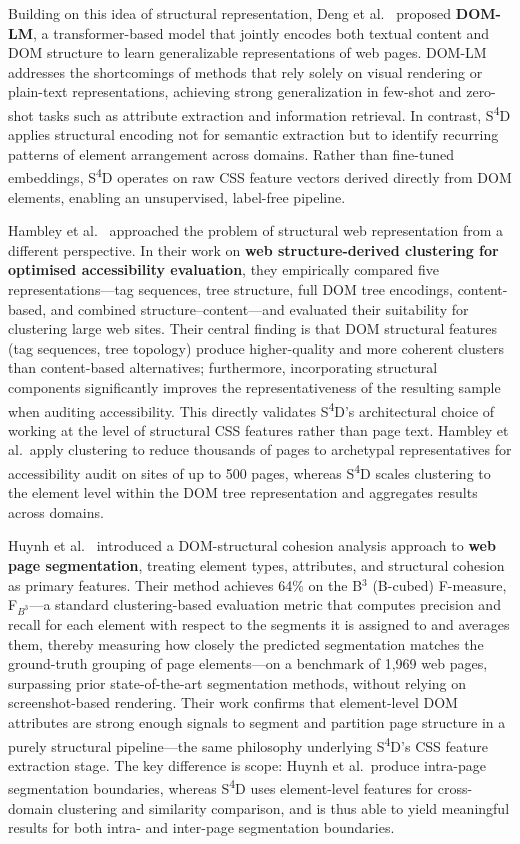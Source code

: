 Building on this idea of structural representation, Deng et al.~\cite{deng2022domlm} proposed \textbf{DOM-LM}, a transformer-based model that jointly encodes both textual content and DOM structure to learn generalizable representations of web pages. DOM-LM addresses the shortcomings of methods that rely solely on visual rendering or plain-text representations, achieving strong generalization in few-shot and zero-shot tasks such as attribute extraction and information retrieval. In contrast, S\textsuperscript{4}D applies structural encoding not for semantic extraction but to identify recurring patterns of element arrangement across domains. Rather than fine-tuned embeddings, S\textsuperscript{4}D operates on raw CSS feature vectors derived directly from DOM elements, enabling an unsupervised, label-free pipeline.

Hambley et al.~\cite{hambley2023webstructure} approached the problem of structural web representation from a different perspective. In their work on \textbf{web structure-derived clustering for optimised accessibility evaluation}, they empirically compared five representations---tag sequences, tree structure, full DOM tree encodings, content-based, and combined structure--content---and evaluated their suitability for clustering large web sites. Their central finding is that DOM structural features (tag sequences, tree topology) produce higher-quality and more coherent clusters than content-based alternatives; furthermore, incorporating structural components significantly improves the representativeness of the resulting sample when auditing accessibility. This directly validates S\textsuperscript{4}D's architectural choice of working at the level of structural CSS features rather than page text. Hambley et al.\ apply clustering to reduce thousands of pages to archetypal representatives for accessibility audit on sites of up to 500 pages, whereas S\textsuperscript{4}D scales clustering to the element level within the DOM tree representation and aggregates results across domains.

Huynh et al.~\cite{huynh2023segmentation} introduced a DOM-structural cohesion analysis approach to \textbf{web page segmentation}, treating element types, attributes, and structural cohesion as primary features. Their method achieves 64\% on the B$^3$ (B-cubed) F-measure, F$_{B^3}$---a standard clustering-based evaluation metric that computes precision and recall for each element with respect to the segments it is assigned to and averages them, thereby measuring how closely the predicted segmentation matches the ground-truth grouping of page elements---on a benchmark of 1,969 web pages, surpassing prior state-of-the-art segmentation methods, without relying on screenshot-based rendering. Their work confirms that element-level DOM attributes are strong enough signals to segment and partition page structure in a purely structural pipeline---the same philosophy underlying S\textsuperscript{4}D's CSS feature extraction stage. The key difference is scope: Huynh et al.\ produce intra-page segmentation boundaries, whereas S\textsuperscript{4}D uses element-level features for cross-domain clustering and similarity comparison, and is thus able to yield meaningful results for both intra- and inter-page segmentation boundaries.

